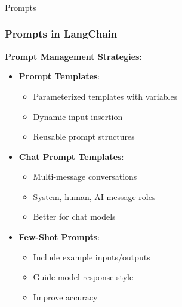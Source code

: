 \begin{frame}[fragile]\frametitle{}
\begin{center}
{\Large Prompts}
\end{center}
\end{frame}

\begin{frame}\frametitle{Prompts in LangChain}

\textbf{Prompt Management Strategies:}

\begin{itemize}
\item \textbf{Prompt Templates}:
    \begin{itemize}
    \item Parameterized templates with variables
    \item Dynamic input insertion
    \item Reusable prompt structures
    \end{itemize}

\item \textbf{Chat Prompt Templates}:
    \begin{itemize}
    \item Multi-message conversations
    \item System, human, AI message roles
    \item Better for chat models
    \end{itemize}

\item \textbf{Few-Shot Prompts}:
    \begin{itemize}
    \item Include example inputs/outputs
    \item Guide model response style
    \item Improve accuracy
    \end{itemize}
\end{itemize}

\end{frame}

